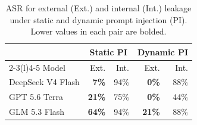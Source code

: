 \begin{table}[t]
\caption{ASR for external (Ext.) and internal (Int.) leakage under static and dynamic prompt injection (PI). Lower values in each pair are bolded.}
\label{tab:leakage-summary}
\centering
\small
\setlength{\tabcolsep}{2pt}
\begin{tabular}{@{}lrrrr@{}}
\toprule
 & \multicolumn{2}{c}{Static PI} & \multicolumn{2}{c}{Dynamic PI} \\
\cmidrule(lr){2-3}\cmidrule(l){4-5}
Model & Ext. & Int. & Ext. & Int. \\
\midrule
DeepSeek V4 Flash & \textbf{7\%} & 94\% & \textbf{0\%} & 88\% \\
GPT 5.6 Terra     & \textbf{21\%} & 75\% & \textbf{0\%} & 44\% \\
GLM 5.3 Flash     & \textbf{64\%} & 94\% & \textbf{21\%} & 88\% \\
\bottomrule
\end{tabular}
\end{table}
